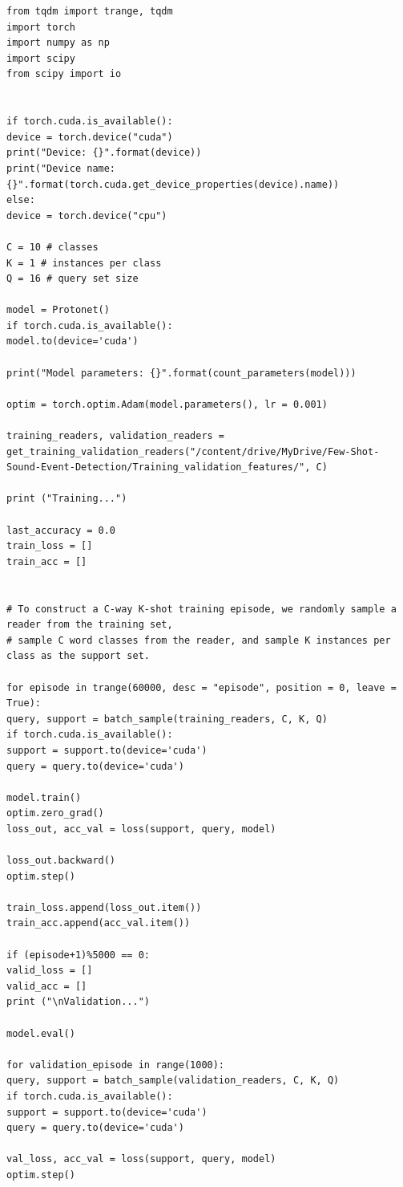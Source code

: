 \documentclass[12pt,a4paper,titlepage]{article}
\begin{document}
\begin{lstlisting}[language=iPython,firstnumber=1, caption=words\_per\_reader.py, label=words_per_reader,captionpos=b]
from tqdm import trange, tqdm
import torch
import numpy as np
import scipy
from scipy import io


if torch.cuda.is_available():
device = torch.device("cuda")
print("Device: {}".format(device))
print("Device name: {}".format(torch.cuda.get_device_properties(device).name))
else:
device = torch.device("cpu")

C = 10 # classes
K = 1 # instances per class
Q = 16 # query set size

model = Protonet()
if torch.cuda.is_available():
model.to(device='cuda')

print("Model parameters: {}".format(count_parameters(model)))

optim = torch.optim.Adam(model.parameters(), lr = 0.001)

training_readers, validation_readers = get_training_validation_readers("/content/drive/MyDrive/Few-Shot-Sound-Event-Detection/Training_validation_features/", C)

print ("Training...")

last_accuracy = 0.0
train_loss = []
train_acc = []


# To construct a C-way K-shot training episode, we randomly sample a reader from the training set, 
# sample C word classes from the reader, and sample K instances per class as the support set.

for episode in trange(60000, desc = "episode", position = 0, leave = True):
query, support = batch_sample(training_readers, C, K, Q)
if torch.cuda.is_available():
support = support.to(device='cuda')
query = query.to(device='cuda')

model.train()
optim.zero_grad()
loss_out, acc_val = loss(support, query, model)

loss_out.backward()
optim.step()

train_loss.append(loss_out.item())
train_acc.append(acc_val.item())

if (episode+1)%5000 == 0:
valid_loss = []
valid_acc = []
print ("\nValidation...")

model.eval()

for validation_episode in range(1000):
query, support = batch_sample(validation_readers, C, K, Q)
if torch.cuda.is_available():
support = support.to(device='cuda')
query = query.to(device='cuda')

val_loss, acc_val = loss(support, query, model)
optim.step()


\end{lstlisting}
\end{document}
